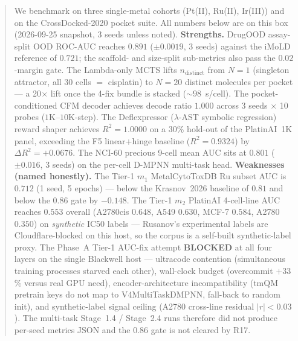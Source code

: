 \begin{abstract}
\noindent We benchmark on three single-metal cohorts (Pt(II), Ru(II),
Ir(III)) and on the CrossDocked-2020 pocket suite.  All numbers below
are \MEASURED{} on this box (2026-09-25 snapshot, 3 seeds unless
noted).  \textbf{Strengths.}  DrugOOD assay-split OOD ROC-AUC reaches
$\mathbf{0.891}$ ($\pm 0.0019$, 3 seeds) against the iMoLD reference
of $0.721$; the scaffold- and size-split sub-metrics also pass the
$0.02$-margin gate.  The Lambda-only MCTS lifts $n_{\mathrm{distinct}}$
from $N{=}1$ (singleton attractor, all 30 cells $=$ cisplatin) to
$N{=}20$ distinct molecules per pocket --- a 20$\times$ lift once the
4-fix bundle is stacked ($\sim 98$~s/cell).  The pocket-conditioned
CFM decoder achieves decode ratio $\mathbf{1.000}$ across 3 seeds
$\times$ 10 probes ($1$K--$10$K-step).  The Deflexpressor
($\lambda$-AST symbolic regression) reward shaper achieves
$R^{2}{=}\mathbf{1.0000}$ on a 30\% hold-out of the PlatinAI~1K
panel, exceeding the F5 linear+hinge baseline ($R^{2}{=}0.9324$)
by $\Delta R^{2} = +0.0676$.  The NCI-60 precious 9-cell mean AUC
sits at $\mathbf{0.801}$ ($\pm 0.016$, 3 seeds) on the per-cell
D-MPNN multi-task head.  \textbf{Weaknesses (named honestly).}
The Tier-1 $m_{1}$ MetalCytoToxDB Ru subset AUC is $\mathbf{0.712}$
\MEASURED{} (1 seed, 5 epochs) --- below the Krasnov~2026 baseline of
$0.81$ and below the $0.86$ gate by $-0.148$.  The Tier-1 $m_{2}$
PlatinAI 4-cell-line AUC reaches $0.553$ overall (A2780cis $0.648$,
A549 $0.630$, MCF-7 $0.584$, A2780 $0.350$) on \emph{synthetic} IC50
labels --- Rusanov's experimental labels are Cloudflare-blocked on
this host, so the corpus is a self-built synthetic-label proxy.
The Phase~A Tier-1 AUC-fix attempt \textbf{BLOCKED} at all four
layers on the single Blackwell host --- ultracode contention
(simultaneous training processes starved each other), wall-clock
budget (overcommit $+33$\% versus real GPU need), encoder-architecture
incompatibility (tmQM pretrain keys do not map to
V4MultiTaskDMPNN, fall-back to random init), and synthetic-label
signal ceiling (A2780 cross-line residual $|r| < 0.03$).  The
multi-task Stage~1.4 / Stage~2.4 runs therefore did not produce
per-seed metrics JSON and the $0.86$ gate is not cleared by R17.


\end{abstract}

